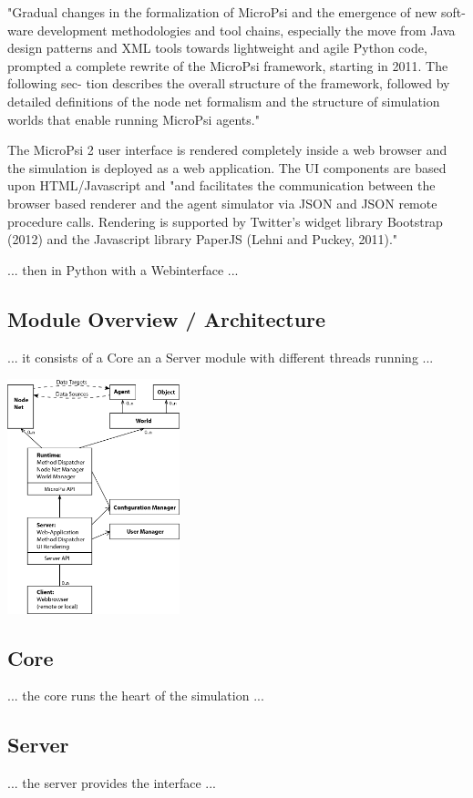 "Gradual changes in the formalization of MicroPsi and the emergence of new soft- ware development methodologies and tool chains, especially the move from Java design patterns and XML tools towards lightweight and agile Python code, prompted a complete rewrite of the MicroPsi framework, starting in 2011. The following sec- tion describes the overall structure of the framework, followed by detailed definitions of the node net formalism and the structure of simulation worlds that enable running MicroPsi agents."~\cite{conf/agi/Bach12}

The MicroPsi 2 user interface is rendered completely inside a web browser and the simulation is deployed as a web application. The UI components are based upon HTML/Javascript and "and facilitates the communication between the browser based renderer and the agent simulator via JSON and JSON remote procedure calls. Rendering is supported by Twitter’s widget library Bootstrap (2012) and the Javascript library PaperJS (Lehni and Puckey, 2011)."~\cite{conf/agi/Bach12}

... then in Python with a Webinterface ...

\subsection{Module Overview / Architecture}
... it consists of a Core an a Server module with different threads running ...

\includegraphics[width=5cm]{graphics/micropsi2_uml}

\subsection{Core}
... the core runs the heart of the simulation ...

\subsection{Server}
... the server provides the interface ...


